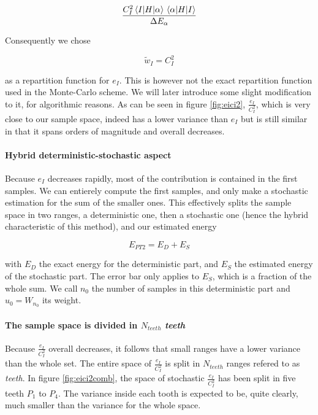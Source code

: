 \documentclass[./thesis.tex]{subfiles}
\begin{document}
\begin{equation}
\frac{C_I^2 \mel{I}{H}{\alpha}\mel{\alpha}{H}{I}}{\Delta E_{\alpha}}
\end{equation}

Consequently we chose

\begin{equation}
\tilde w_I = C_I^2
\end{equation}

as a repartition function for $e_I$. This is however not the exact repartition function used in the Monte-Carlo scheme. We will later introduce some slight modification to it, for algorithmic reasons.
As can be seen in figure \ref{fig:eici2}, $\frac{e_I}{C_I^2}$, which is very close to our sample space, indeed has a lower variance than $e_I$ but is still similar in that it spans orders of magnitude and overall decreases.

\paragraph{Hybrid deterministic-stochastic aspect}
Because $e_I$ decreases rapidly, most of the contribution is contained in the first samples. We can entierely compute the first samples, and only make a stochastic estimation for the sum of the smaller ones. This effectively splits the sample space in two ranges, a deterministic one, then a stochastic one (hence the hybrid characteristic of this method), and our estimated energy

$$E_{PT2} = E_D + E_S$$

with $E_D$ the exact energy for the deterministic part, and $E_S$ the estimated energy of the stochastic part. The error bar only applies to $E_S$, which is a fraction of the whole sum.
We call $n_0$ the number of samples in this deterministic part and $u_0 = W_{n_0}$ its weight.



\paragraph{The sample space is divided in $N_{teeth}$ \emph{teeth}}

Because $\frac{e_I}{C_I^2}$ overall decreases, it follows that small ranges have a lower variance than the whole set. The entire space of $\frac{e_I}{C_I^2}$ is split in $N_{teeth}$ ranges refered to as \emph{teeth}. In figure \ref{fig:eici2comb}, the space of stochastic $\frac{e_I}{C_I^2}$ has been split in \alert{five teeth $P_1$ to $P_4$}. The variance inside each tooth is expected to be, quite clearly, much smaller than the variance for the whole space.
\end{document}
